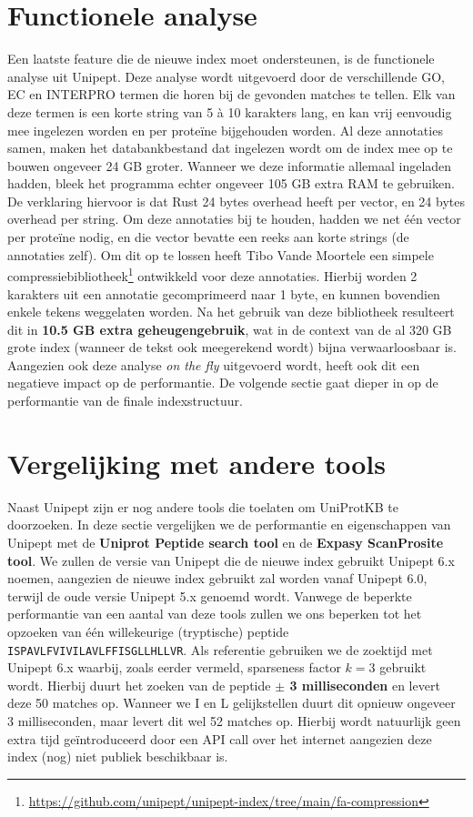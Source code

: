 \section{Functionele analyse}\label{sec:functionele-analyse}
Een laatste feature die de nieuwe index moet ondersteunen, is de functionele analyse uit Unipept.
Deze analyse wordt uitgevoerd door de verschillende GO, EC en INTERPRO termen die horen bij de gevonden matches te tellen.
Elk van deze termen is een korte string van 5 à 10 karakters lang, en kan vrij eenvoudig mee ingelezen worden en per proteïne bijgehouden worden.
Al deze annotaties samen, maken het databankbestand dat ingelezen wordt om de index mee op te bouwen ongeveer 24 GB groter.
Wanneer we deze informatie allemaal ingeladen hadden, bleek het programma echter ongeveer 105 GB extra RAM te gebruiken.
De verklaring hiervoor is dat Rust 24 bytes overhead heeft per vector, en 24 bytes overhead per string.
Om deze annotaties bij te houden, hadden we net één vector per proteïne nodig, en die vector bevatte een reeks aan korte strings (de annotaties zelf).
Om dit op te lossen heeft Tibo Vande Moortele een simpele compressiebibliotheek\footnote{\url{https://github.com/unipept/unipept-index/tree/main/fa-compression}} ontwikkeld voor deze annotaties.
Hierbij worden 2 karakters uit een annotatie gecomprimeerd naar 1 byte, en kunnen bovendien enkele tekens weggelaten worden.
Na het gebruik van deze bibliotheek resulteert dit in \textbf{10.5 GB extra geheugengebruik}, wat in de context van de al 320 GB grote index (wanneer de tekst ook meegerekend wordt) bijna verwaarloosbaar is.
Aangezien ook deze analyse \textit{on the fly} uitgevoerd wordt, heeft ook dit een negatieve impact op de performantie.
De volgende sectie gaat dieper in op de performantie van de finale indexstructuur.

\section{Vergelijking met andere tools}\label{subsec:vergelijking-met-andere-tools}
Naast Unipept zijn er nog andere tools die toelaten om UniProtKB te doorzoeken.
In deze sectie vergelijken we de performantie en eigenschappen van Unipept met de \textbf{Uniprot Peptide search tool} en de \textbf{Expasy ScanProsite tool}.
We zullen de versie van Unipept die de nieuwe index gebruikt Unipept 6.x noemen, aangezien de nieuwe index gebruikt zal worden vanaf Unipept 6.0, terwijl de oude versie Unipept 5.x genoemd wordt.
Vanwege de beperkte performantie van een aantal van deze tools zullen we ons beperken tot het opzoeken van één willekeurige (tryptische) peptide \texttt{ISPAVLFVIVILAVLFFISGLLHLLVR}.
Als referentie gebruiken we de zoektijd met Unipept 6.x waarbij, zoals eerder vermeld, sparseness factor $k = 3$ gebruikt wordt.
Hierbij duurt het zoeken van de peptide \textbf{$\pm$ 3 milliseconden} en levert deze 50 matches op.
Wanneer we I en L gelijkstellen duurt dit opnieuw ongeveer 3 milliseconden, maar levert dit wel 52 matches op.
Hierbij wordt natuurlijk geen extra tijd geïntroduceerd door een API call over het internet aangezien deze index (nog) niet publiek beschikbaar is.

